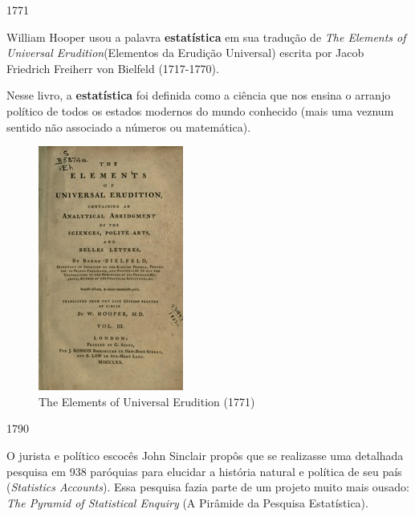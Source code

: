 \documentclass[
]{book}
\theoremstyle{definition}
\theoremstyle{definition}
\theoremstyle{definition}
\theoremstyle{definition}
\theoremstyle{remark}
\begin{document}
1771

William Hooper usou a palavra \textbf{estatística} em sua tradução de \emph{The Elements of Universal Erudition}(Elementos da Erudição Universal) escrita por Jacob Friedrich Freiherr von Bielfeld (1717-1770).

Nesse livro, a \textbf{estatística} foi definida como a ciência que nos ensina o arranjo político de todos os estados modernos do mundo conhecido (mais uma veznum sentido não associado a números ou matemática).

\begin{figure}

{\centering \includegraphics[width=0.5\linewidth]{images/hooper} 

}

\caption{The Elements of Universal Erudition  (1771)}\label{fig:unnamed-chunk-7}
\end{figure}

1790

O jurista e político escocês John Sinclair propôs que se realizasse uma detalhada pesquisa em 938 paróquias para elucidar a história natural e política de seu país (\emph{Statistics Accounts}). Essa pesquisa fazia parte de um projeto muito mais ousado: \emph{The Pyramid of Statistical Enquiry} (A Pirâmide da Pesquisa Estatística).
\end{document}
